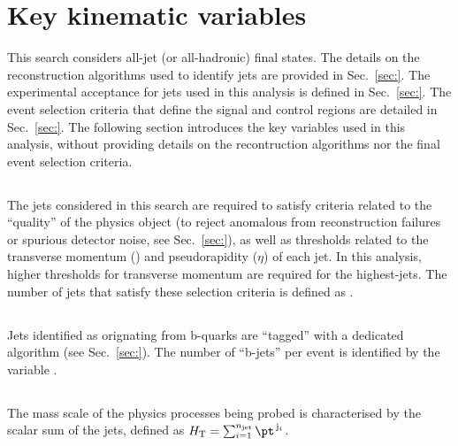 \section{Key kinematic variables}

This search considers all-jet (or all-hadronic) final states. The
details on the reconstruction algorithms used to identify jets are
provided in Sec.~\ref{sec:}. The experimental acceptance for jets used
in this analysis is defined in Sec.~\ref{sec:}. The event selection
criteria that define the signal and control regions are detailed in
Sec.~\ref{sec:}. The following section introduces the key variables
used in this analysis, without providing details on the recontruction
algorithms nor the final event selection criteria.

\subsection{\texorpdfstring{\njet}{Njet}}

The jets considered in this search are required to satisfy criteria
related to the ``quality'' of the physics object (to reject anomalous
from \eg reconstruction failures or spurious detector noise, see
Sec.~\ref{sec:}), as well as thresholds related to the transverse
momentum (\Pt) and pseudorapidity ($\eta$) of each jet. In this
analysis, higher thresholds for transverse momentum are required for
the highest-\Pt jets. The number of jets that satisfy these selection
criteria is defined as \njet.

\subsection{\texorpdfstring{\nb}{Nb}}

Jets identified as orignating from b-quarks are ``tagged'' with a
dedicated algorithm (see Sec.~\ref{sec:}). The number of ``b-jets''
per event is identified by the variable \nb.

\subsection{\texorpdfstring{\scalht}{HT}}

The mass scale of the physics processes being probed is characterised
by the scalar \pt sum of the jets, defined as $\scalht =
\sum_{i=1}^{\njet} \pt^{\,\mathrm{j}_i}$.

\subsection{\texorpdfstring{\HTmiss}{HTmiss}}

